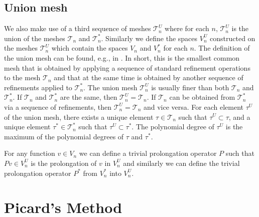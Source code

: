 \documentclass[smallextended]{svjour3}
\begin{document}
\subsection{Union mesh}

We also make use of a third sequence of meshes $\mathcal{T}_n^U$ where for each $n$, $\mathcal{T}_n^U$ is the 
union of the meshes  $\mathcal{T}_n$ and $\mathcal{T}_n^*$. Similarly we define the spaces $V_n^U$ constructed 
on the meshes $\mathcal{T}_n^U$ which contain the spaces $V_n$ and $V_n^*$ for each $n$. 
The definition of the union mesh can be found, e.g., 
in \cite{solin2}. In short, this is the smallest common mesh that is obtained by applying a sequence of standard 
refinement operations to the mesh $\mathcal{T}_n$ and that at the same time is obtained by another sequence of 
refinements applied to $\mathcal{T}_n^*$. The union mesh $\mathcal{T}_n^U$ is usually finer than both 
$\mathcal{T}_n$ and $\mathcal{T}_n^*$.
If $\mathcal{T}_n$ and $\mathcal{T}_n^*$ are the same, then $\mathcal{T}_n^U = \mathcal{T}_n$. If 
$\mathcal{T}_n$ can be obtained from $\mathcal{T}_n^*$ via a sequence of refinements, then 
$\mathcal{T}_n^U = \mathcal{T}_n$ and vice versa. For each element $\tau^U$ of the union mesh, there exists
a unique element $\tau \in \mathcal{T}_n$ such that $\tau^U \subset \tau$, and a unique element 
$\tau^* \in \mathcal{T}^*_n$ such that $\tau^U \subset \tau^*$. The polynomial degree of $\tau^U$ is the maximum 
of the polynomial degrees of $\tau$ and $\tau^*$.

For any function $v\in V_n$ we can define a trivial prolongation operator $P$ such that $Pv\in V_n^U$ is the prolongation of $v$ in $V_n^U$ and similarly we can define the trivial prolongation operator $P^*$ from $V_n^*$ into $V_n^U$. %


\section{Picard's Method}\label{sec:picard}
\end{document}
